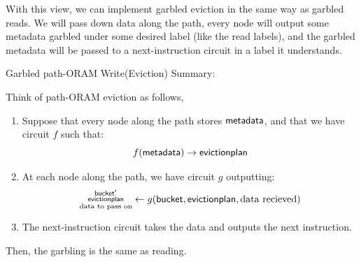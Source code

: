 With this view, we can implement garbled eviction in the same way as garbled reads. We will pass down data along the path, every node will output some metadata garbled under some desired label (like the read labels), and the garbled metadata will be passed to a next-instruction circuit in a label it understands.

\begin{mdframed}[innertopmargin=5pt, skipabove=\topskip, skipbelow=\topskip,align=left,nobreak=true]
Garbled path-ORAM Write(Eviction) Summary:

Think of path-ORAM eviction as follows,
\begin{enumerate}
    \item Suppose that every node along the path stores $\mathsf{metadata}$, and that we have circuit $f$ such that:
    \[f(\mathsf{metadata}) \rightarrow \mathsf{eviction plan}\]
    \item At each node along the path, we have circuit $g$ outputting:
    \[\substack{\mathsf{bucket'}\\\mathsf{eviction plan}\\ \text{data to pass on}} \leftarrow g(\mathsf{bucket}, \mathsf{eviction plan}, \text{data recieved})\]
    \item The next-instruction circuit takes the data and outputs the next instruction.  
    \end{enumerate}
    Then, the garbling is the same as reading.
\end{mdframed}
